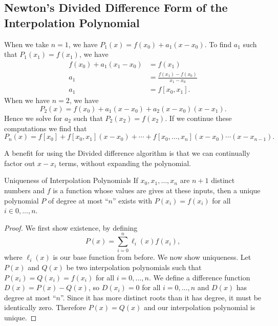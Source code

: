 \documentclass[class=article, crop=false]{standalone}
\begin{document}
  \subsection{Newton's Divided Difference Form of the Interpolation Polynomial}
  When we take $n = 1$, we have $P_1(x) = f(x_0) + a_1(x - x_0)$. To find $a_1$ such that $P_1(x_1) = f(x_1)$, we have
  \begin{align*}
    f(x_0) + a_1(x_1 - x_0) &= f(x_1) \\
    a_1 &= \frac{f(x_1) - f(x_0)}{x_1 - x_0} \\
    a_1 &= f[x_0, x_1].
  \end{align*}
  When we have $n = 2$, we have
  \[
    P_2(x) = f(x_0) + a_1(x - x_0) + a_2(x - x_0)(x - x_1).
  \]
  Hence we solve for $a_2$ such that $P_2(x_2) = f(x_2)$. If we continue these computations we find that
  \[
    P_n(x) = f[x_0] + f[x_0, x_1](x - x_0) + \dotsb + f[x_0,\dotsc,x_n](x - x_0)\dotsb(x - x_{n - 1}).
  \]
  \begin{note}{}
    A benefit for using the Divided difference algorithm is that we can continually factor out $x - x_i$ terms, without expanding the polynomial.
  \end{note}
  \begin{theorem}{Uniqueness of Interpolation Polynomials}
    If $x_0,x_1,\dotsc,x_n$ are $n + 1$ distinct numbers and $f$ is a function whose values are gives at these inputs, then a unique polynomial $P$ of degree at most ``$n$'' exists with $P(x_i) = f(x_i)$ for all $i\in 0,\dotsc,n$.
    \begin{proof}
      We first show existence, by defining
      \[
        P(x) = \sum_{i=0}^{n} \ell_i(x)f(x_i),
      \]
      where $\ell_i(x)$ is our base function from before. We now show uniqueness. Let $P(x)$ and $Q(x)$ be two interpolation polynomials such that $P(x_i) = Q(x_i) = f(x_i)$ for all $i=0,\dotsc,n$. We define a difference function $D(x) = P(x) - Q(x)$, so $D(x_i) = 0$ for all $i = 0,\dotsc,n$ and $D(x)$ has degree at most ``$n$''. Since it has more distinct roots than it has degree, it must be identically zero. Therefore $P(x) = Q(x)$ and our interpolation polynomial is unique.
    \end{proof}
  \end{theorem}
\end{document}

